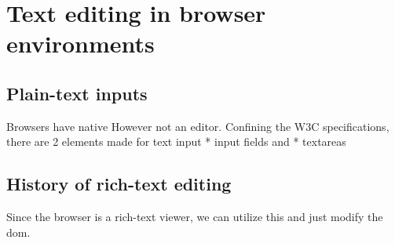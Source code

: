 \chapter{Text editing in browser environments}


\section{Plain-text inputs}

Browsers have native 
However not an editor.
Confining the W3C specifications, there are 2 elements made for text input
 * input fields and
 * textareas
 

\section{History of rich-text editing}


Since the browser is a rich-text viewer, we can utilize this and just modify the dom.



